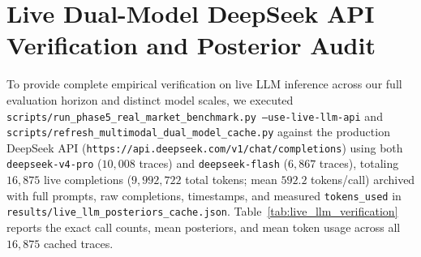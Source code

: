 \documentclass[10pt,a4paper,twocolumn]{article}
\begin{document}
\section{Live Dual-Model DeepSeek API Verification and Posterior Audit}
\label{app:live_llm}

To provide complete empirical verification on live LLM inference across our full evaluation horizon and distinct model scales, we executed \texttt{scripts/run\_phase5\_real\_market\_benchmark.py --use-live-llm-api} and \texttt{scripts/refresh\_multimodal\_dual\_model\_cache.py} against the production DeepSeek API (\texttt{https://api.deepseek.com/v1/chat/completions}) using both \texttt{deepseek-v4-pro} ($10,008$ traces) and \texttt{deepseek-flash} ($6,867$ traces), totaling $16,875$ live completions ($9,992,722$ total tokens; mean $592.2$ tokens/call) archived with full prompts, raw completions, timestamps, and measured \texttt{tokens\_used} in \texttt{results/live\_llm\_posteriors\_cache.json}. Table~\ref{tab:live_llm_verification} reports the exact call counts, mean posteriors, and mean token usage across all $16,875$ cached traces.
\end{document}
